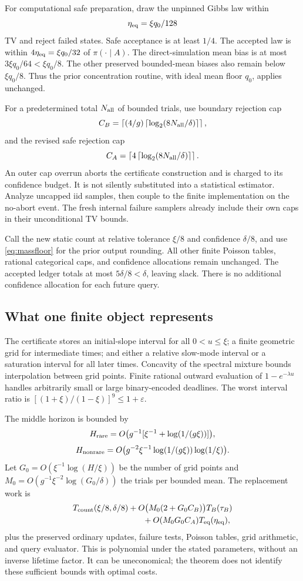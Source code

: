 \documentclass[11pt]{article}
\newcommand{\ceil}[1]{\left\lceil #1\right\rceil}
\newcommand{\eps}{\varepsilon}
\begin{document}
For computational safe preparation, draw the unpinned Gibbs law within
\[
 \eta_{\rm eq}=\xi q_0/128
\]
TV and reject failed states. Safe acceptance is at least $1/4$. The accepted law is within $4\eta_{\rm eq}=\xi q_0/32$ of $\pi(\cdot\mid A)$. The direct-simulation mean bias is at most $3\xi q_0/64<\xi q_0/8$. The other preserved bounded-mean biases also remain below $\xi q_0/8$. Thus the prior concentration routine, with ideal mean floor $q_0$, applies unchanged.

For a predetermined total $N_{\rm all}$ of bounded trials, use boundary rejection cap
\[
 C_B=\ceil{(4/g)\ceil{\log_2(8N_{\rm all}/\delta)}},
\]
and the revised safe rejection cap
\[
 C_A=\ceil{4\ceil{\log_2(8N_{\rm all}/\delta)}}.
\]
An outer cap overrun aborts the certificate construction and is charged to its confidence budget. It is not silently substituted into a statistical estimator. Analyze uncapped iid samples, then couple to the finite implementation on the no-abort event. The fresh internal failure samplers already include their own caps in their unconditional TV bounds.

Call the new static count at relative tolerance $\xi/8$ and confidence $\delta/8$, and use \eqref{eq:massfloor} for the prior output rounding. All other finite Poisson tables, rational categorical caps, and confidence allocations remain unchanged. The accepted ledger totals at most $5\delta/8<\delta$, leaving slack. There is no additional confidence allocation for each future query.

\subsection{What one finite object represents}
The certificate stores an initial-slope interval for all $0<u\le\xi$; a finite geometric grid for intermediate times; and either a relative slow-mode interval or a saturation interval for all later times. Concavity of the spectral mixture bounds interpolation between grid points. Finite rational outward evaluation of $1-e^{-\lambda u}$ handles arbitrarily small or large binary-encoded deadlines. The worst interval ratio is $[(1+\xi)/(1-\xi)]^9\le1+\eps$.

The middle horizon is bounded by
\[
 H_{\rm rare}=O\bigl(g^{-1}[\xi^{-1}+\log(1/(g\xi))]\bigr),
\]
\[
 H_{\rm nonrare}=O\bigl(g^{-2}\xi^{-1}\log(1/(g\xi))\log(1/\xi)\bigr).
\]
Let $G_0=O(\xi^{-1}\log(H/\xi))$ be the number of grid points and $M_0=O(g^{-1}\xi^{-2}\log(G_0/\delta))$ the trials per bounded mean. The replacement work is
\begin{align*}
 &T_{\rm count}(\xi/8,\delta/8)
 +O\bigl(M_0(2+G_0C_B)\bigr)T_B(\tau_B)\\
 &\hspace{30mm}+O(M_0G_0C_A)T_{\rm eq}(\eta_{\rm eq}),
\end{align*}
plus the preserved ordinary updates, failure tests, Poisson tables, grid arithmetic, and query evaluator. This is polynomial under the stated parameters, without an inverse lifetime factor. It can be uneconomical; the theorem does not identify these sufficient bounds with optimal costs.
\end{document}
